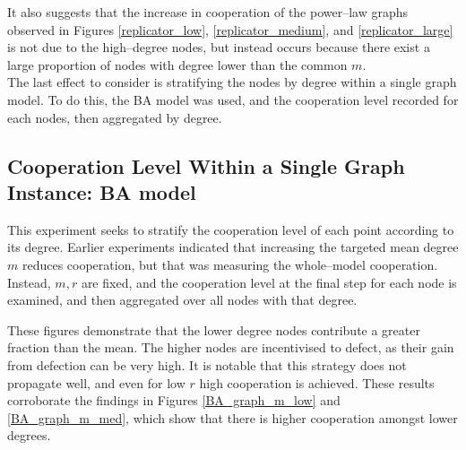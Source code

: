 It also suggests that the increase in cooperation of the power--law graphs observed in Figures \ref{replicator_low}, \ref{replicator_medium}, and \ref{replicator_large} is not due to the high--degree nodes, but instead occurs because there exist a large proportion of nodes with degree lower than the common $m$.  \\

The last effect to consider is stratifying the nodes by degree within a single graph model. To do this, the BA model was used, and the cooperation level recorded for each nodes, then aggregated by degree. \\

\subsection{Cooperation Level Within a Single Graph Instance: BA model }
This experiment seeks to stratify the cooperation level of each point according to its degree. Earlier experiments indicated that increasing the targeted mean degree $m$ reduces cooperation, but that was measuring the whole--model cooperation. Instead, $m, r$ are fixed, and the cooperation level at the final step for each node is examined, and then aggregated over all nodes with that degree. \\
\FloatBarrier
{}
\FloatBarrier

\FloatBarrier
{}
\FloatBarrier

These figures demonstrate that the lower degree nodes contribute a greater fraction than the mean. The higher nodes are incentivised to defect, as their gain from defection can be very high. It is notable that this strategy does not propagate well, and even for low $r$ high cooperation is achieved. These results corroborate the findings in Figures \ref{BA_graph_m_low} and \ref{BA_graph_m_med}, which show that there is higher cooperation amongst lower degrees. \\

